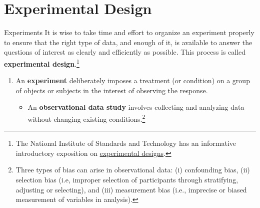 \documentclass[pdf]{beamer}
\newcommand{\empr}[1]{{\color{franklinblue}\textbf{#1}}}
\theoremstyle{remark}
\theoremstyle{definition}
\begin{document}
\section{Experimental Design}

\begin{frame}[t]{Experiments}
It is wise to take time and effort to organize an experiment properly to ensure that the right type of data, and enough of it, is available to answer the questions of interest as clearly and efficiently as possible. This process is called \empr{experimental design}.\footnote{The National Institute of Standards and Technology 
 has an informative introductory exposition on \href{https://www.itl.nist.gov/div898/handbook/pri/pri.htm}{experimental designs}.}
\begin{enumerate}
\item An \empr{experiment} deliberately imposes a treatment (or condition) on a group of objects or subjects in the interest of observing the response. \\
\vspace{1.5ex}
\begin{itemize}
\item An \empr{observational data study} involves collecting and analyzing data without changing existing conditions.\footnote{Three types of bias can arise in observational data: (i) confounding bias, (ii) selection bias (i.e, improper selection of participants through stratifying, adjusting or selecting), and (iii) measurement bias (i.e., imprecise or biased measurement of variables in analysis).} 
\end{itemize}
\end{enumerate}
\end{frame}
\end{document}
